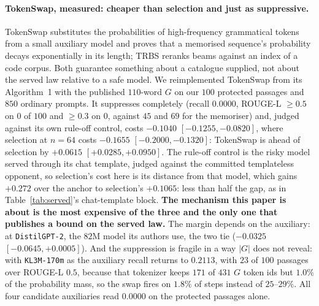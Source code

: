 \paragraph{TokenSwap, measured: cheaper than selection and just as suppressive.}\label{app:tokenswap}
TokenSwap \citep{prashant2025tokenswap} substitutes the probabilities of high-frequency grammatical tokens
from a small auxiliary model and proves that a memorised sequence's probability decays exponentially in its
length; TRBS \citep{fu2026duplicate} reranks beams against an index of a code corpus. Both guarantee
something about a catalogue supplied, not about the served law relative to a safe model. We reimplemented
TokenSwap from its Algorithm~1 with the published $110$-word $G$ on our $100$ protected passages and $850$
ordinary prompts. It suppresses completely (recall $0.0000$, ROUGE-L $\ge 0.5$ on $0$ of $100$ and $\ge 0.3$
on $0$, against $45$ and $69$ for the memoriser) and, judged against its own rule-off control, costs
$-0.1040$ $[-0.1255, -0.0820]$, where selection at $n=64$ costs $-0.1655$ $[-0.2000, -0.1320]$: TokenSwap is
ahead of selection by $+0.0615$ $[+0.0285, +0.0950]$. The rule-off control is the risky model served
through its chat template, judged against the committed templateless opponent, so selection's cost here
is its distance from that model, which gains $+0.272$ over the anchor to selection's $+0.1065$: less than
half the gap, as in Table~\ref{tab:served}'s chat-template block. \textbf{The mechanism this paper is about is the most
expensive of the three and the only one that publishes a bound on the served law.} The margin depends on
the auxiliary: at \texttt{DistilGPT-2}, the $82$M model its authors use, the two tie ($-0.0325$
$[-0.0645, +0.0005]$). And the suppression is fragile in a way $|G|$ does not reveal: with
\texttt{KL3M-170m} as the auxiliary recall returns to $0.2113$, with $23$ of $100$ passages over ROUGE-L
$0.5$, because that tokenizer keeps $171$ of $431$ $G$ token ids but $1.0\%$ of the probability mass, so the
swap fires on $1.8\%$ of steps instead of $25$--$29\%$. All four candidate auxiliaries read $0.0000$ on the
protected passages alone.

